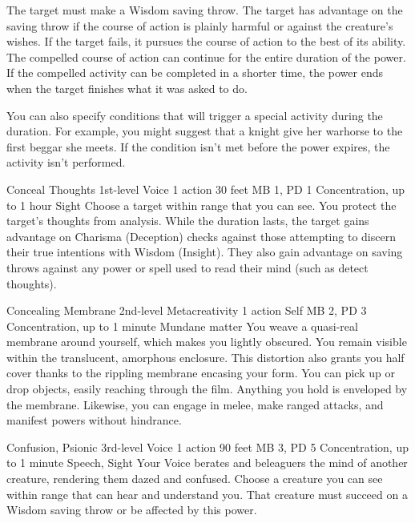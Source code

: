 The target must make a Wisdom saving throw. The target has
advantage on the saving throw if the course of action is plainly
harmful or against the creature's wishes. If the target fails,
it pursues the course of action to the best of its ability.
The compelled course of action can continue for the entire
duration of the power. If the compelled activity can be completed
in a shorter time, the power ends when the target finishes
what it was asked to do.

You can also specify conditions that will trigger a special
activity during the duration. For example, you might suggest
that a knight give her warhorse to the first beggar she meets.
If the condition isn't met before the power expires, the
activity isn't performed.

\DndPowerHeader%
    {Conceal Thoughts\label{pwr:conceal-thoughts}}
    {1st-level Voice}
    {1 action}
    {30 feet}
    {MB 1, PD 1}
    {Concentration, up to 1 hour}
    {Sight}
Choose a target within range that you can
see. You protect the target's thoughts from analysis. While
the duration lasts, the target gains advantage on 
Charisma (Deception) checks against those
attempting to discern their true intentions
with Wisdom (Insight). They also gain advantage on saving
throws against any power or spell used to read their mind
(such as detect thoughts).

\DndPowerHeader%
    {Concealing Membrane\label{pwr:concealing-membrane}}
    {2nd-level Metacreativity}
    {1 action}
    {Self}
    {MB 2, PD 3}
    {Concentration, up to 1 minute}
    {Mundane matter}
You weave a quasi-real membrane around yourself,
which makes you lightly obscured. You remain visible within
the translucent, amorphous enclosure. This distortion also
grants you half cover thanks to the rippling membrane encasing
your form. You can pick up or drop objects, easily reaching
through the film. Anything you hold is enveloped by the membrane.
Likewise, you can engage in melee, make ranged attacks, and
manifest powers without hindrance.

\DndPowerHeader%
    {Confusion, Psionic\label{pwr:confusion-psionic}}
    {3rd-level Voice}
    {1 action}
    {90 feet}
    {MB 3, PD 5}
    {Concentration, up to 1 minute}
    {Speech, Sight}
Your Voice berates and beleaguers the mind of another creature,
rendering them dazed and confused.
Choose a creature you can see within range that can
hear and understand you.
That creature must succeed on a Wisdom saving throw or
be affected by this power.

